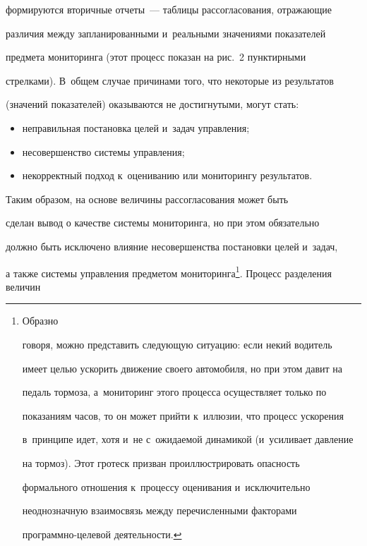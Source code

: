 \begin{enumerate}[1.]
формируются вторичные отчеты~--- таблицы рассогласования, отражающие 


различия между запланированными и~реальными значениями показателей 


предмета мониторинга (этот процесс показан на рис.~2 пунктирными 


стрелками). В~общем случае причинами того, что некоторые из результатов 


(значений показателей) оказываются не достигнутыми, могут стать:


     \begin{itemize}


\item неправильная постановка целей и~задач управления;


\item несовершенство системы управления;


\item некорректный подход к~оцениванию или мониторингу результатов.


\end{itemize}


     


     Таким образом, на основе величины рассогласования может быть 


сделан вывод о качестве системы мониторинга, но при этом обязательно 


должно быть исключено влияние несовершенства постановки целей и~задач, 


а также системы управления предметом мониторинга\footnote{Образно 


говоря, можно представить следующую ситуацию: если некий водитель 


имеет целью ускорить движение своего автомобиля, но при этом давит на 


педаль тормоза, а~мониторинг этого процесса осуществляет только по 


показаниям часов, то он может прийти к~иллюзии, что процесс ускорения 


в~принципе идет, хотя и~не с~ожидаемой динамикой (и~усиливает давление 


на тормоз). Этот гротеск призван проиллюстрировать опасность 


формального отношения к~процессу оценивания и~исключительно 


неоднозначную взаимосвязь между перечисленными факторами  


про\-граммно-це\-ле\-вой деятельности.}. Процесс разделения величин 



\end{enumerate}
